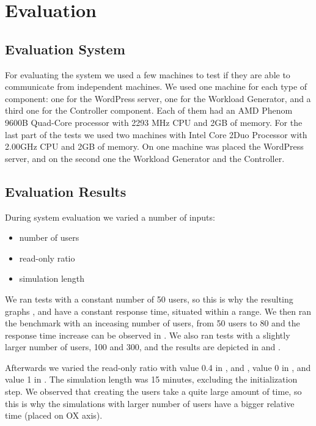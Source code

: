 \chapter{Evaluation}
\label{chapter:chapter5}

\section{Evaluation System}
\label{sec:testing-system}

For evaluating the system we used a few machines to test if they are able to communicate from independent machines. We used one machine for each type of component: one for the WordPress server, one for the Workload Generator, and a third one for the Controller component. Each of them had an AMD Phenom 9600B Quad-Core processor with 2293 MHz CPU and 2GB of memory. For the last part of the tests we used two machines with Intel Core 2Duo Processor with 2.00GHz CPU and 2GB of memory. On one machine was placed the WordPress server, and on the second one the Workload Generator and the Controller.

\section{Evaluation Results}
\label{sub-sec:test-results}

During system evaluation we varied a number of inputs:
\begin{itemize}
 \item number of users
 \item read-only ratio
 \item simulation length
\end{itemize}

We ran tests with a constant number of 50 users, so this is why the resulting graphs ,  and  have a constant response time, situated within a range. We then ran the benchmark with an inceasing number of users, from 50 users to 80 and the response time increase can be observed in . We also ran tests with a slightly larger number of users, 100 and 300, and the results are depicted in  and .

Afterwards we varied the read-only ratio with value 0.4 in ,  and , value 0  in , and value 1 in . The simulation length was 15 minutes, excluding the initialization step. We observed that creating the users take a quite large amount of time, so this is why the simulations with larger number of users have a bigger relative time (placed on OX axis).


